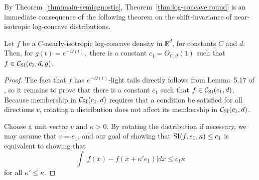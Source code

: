 By Theorem~\ref{thm:main-semiagnostic}, Theorem~\ref{thm:log-concave.round} is an immediate consequence of the following theorem on the
shift-invariance of near-isotropic log-concave distributions.
\begin{theorem}
\label{t:lc_shift_invariant}
Let $f$ be a $C$-nearly-isotropic log-concave density in $\mathbb{R}^d$,
for constants $C$ and $d$.  Then, for $g(t) = e^{-\Omega(t)},$ 
there is a constant $c_1=O_{C,d}(1)$ such that $f \in {\mathcal C}_{\mathrm{SI}}(c_1, d, g)$.
\end{theorem}
\begin{proof}
The fact that $f$ has $e^{-\Omega(t)}$-light tails directly follows from Lemma~5.17 of
\citep{LovaszVempala07}, so it remains to prove that there is
a constant $c_1$ such that
$f \in {\mathcal C}_{\mathrm{SI}}(c_1, d)$.  
Because membership in ${\mathcal C}_{\mathrm{SI}}(c_1, d)$ requires that a condition
be satisfied for all directions $v$, rotating a distribution does not affect its membership
in ${\mathcal C}_{\mathrm{SI}}(c_1, d)$.

Choose a unit vector $v$ and $\kappa>0$.  
By rotating the distribution if necessary, 
we may assume that $v=e_1$, and our goal of showing that ${\mathrm{SI}}(f,e_1,\kappa) \leq c_1$
is equivalent to showing that
\begin{equation}\label{eq:AAA}
\int |f(x) - f(x + \kappa' e_1)| dx \leq c_1 \kappa
\end{equation}
for all $\kappa' \leq \kappa.$


\end{proof}
